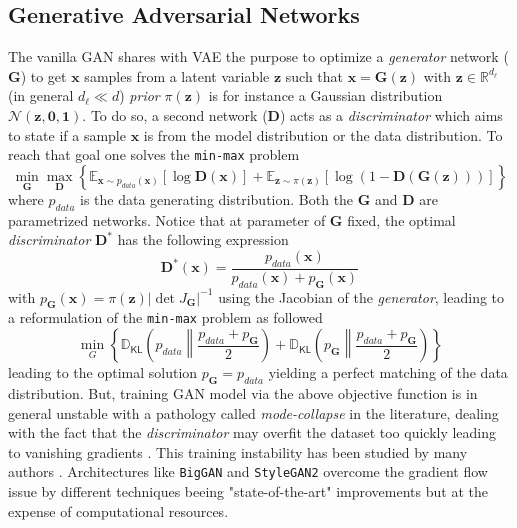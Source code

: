 \documentclass[11pt]{amsart}
\newcommand{\Esp}[0]{\ensuremath{\mathbb{E}}}
\newcommand{\DKL}[0]{\ensuremath{\mathbb{D}_{\mathsf{KL}}}}
\begin{document}
\subsection{Generative Adversarial Networks}
\label{sec-GAN}
%
The vanilla GAN \citep{goodfellow2014generative} shares with VAE the purpose to optimize a \textit{generator} network ($\bm{G}$) to get $\bm{x}$ samples from a latent variable $\bm{z}$ such that  $\bm{x} = \bm{G}(\bm{z})$ with $\bm{z}\in\mathbb{R}^{d_\ell}$ (in general $d_\ell\ll d$) \textit{prior} $\pi(\bm{z})$ is for instance a Gaussian distribution $\mathcal{N}(\bm{z},\bm{0},\bm{1})$. To do so, a second network ($\bm{D}$) acts as a \textit{discriminator} which aims to state if a sample $\bm{x}$ is from the model distribution or the data distribution. To reach that goal one solves the \texttt{min-max} problem
\begin{equation}
\min_{\bm{G}} \max_{\bm{D}}\left\{ \Esp_{\bm{x}\sim p_{data}(\bm{x})}[\log \bm{D}(\bm{x})] + \Esp_{\bm{z}\sim \pi(\bm{z})}[\log(1-\bm{D}(\bm{G}(\bm{z})))] \right\}
\end{equation} 
where $p_{data}$ is the data generating distribution. Both the  $\bm{G}$ and $\bm{D}$ are parametrized networks. Notice that at parameter of $\bm{G}$ fixed, the optimal \textit{discriminator} $\bm{D}^\ast$ has the following expression
\begin{equation}
\bm{D}^\ast(\bm{x}) = \frac{p_{data}(\bm{x})}{p_{data}(\bm{x}) + p_{\bm{G}}(\bm{x})}
\end{equation}
with $p_{\bm{G}}(\bm{x}) = \pi(\bm{z})|\det J_{\bm{G}} |^{-1}$ using the Jacobian of the \textit{generator}, leading to a reformulation of the \texttt{min-max} problem as followed
\begin{equation}
\min_G \left\{ \DKL{\left( p_{data} \left\| \frac{p_{data} + p_{\bm{G}}}{2}\right. \right) }  + \DKL{\left(p_{\bm{G}} \left\| \frac{p_{data} + p_{\bm{G}}}{2} \right. \right)} \right\}
\end{equation}
leading to the optimal solution $p_{\bm{G}} = p_{data}$ yielding a perfect matching of the data distribution.  But, training GAN model via the above objective function is in general unstable with a pathology called \textit{mode-collapse} in the literature, dealing with the fact that the \textit{discriminator} may overfit the dataset too quickly leading to vanishing gradients \citep{Gulrajani2017}. This training instability has been studied by many authors \citep[see e.g.][for some reviews]{Saxena2021,Jozdani2022}. Architectures like \texttt{BigGAN} \citep{Brock2019} and \texttt{StyleGAN2} \cite{Karras2018ASG,Karras2020} overcome the gradient flow issue by different techniques beeing "state-of-the-art" improvements but at the expense of computational resources. 
\end{document}
